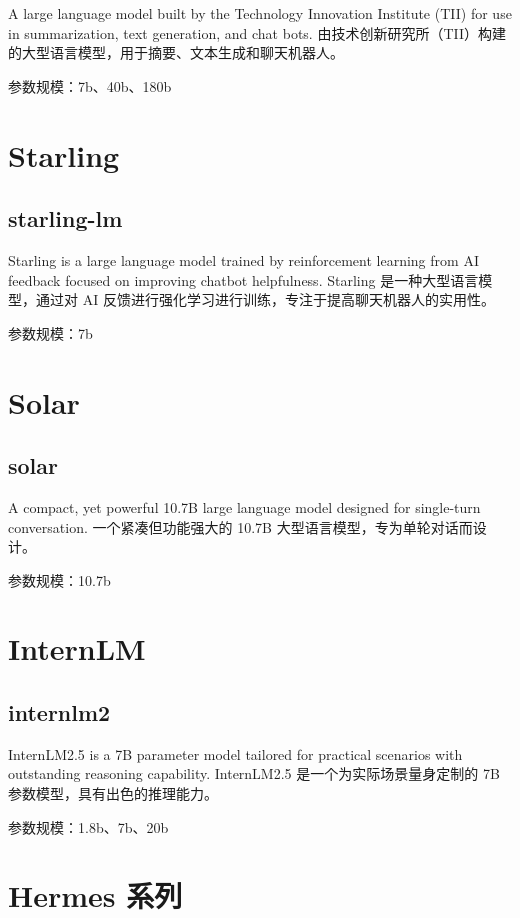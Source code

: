 \documentclass[12pt,UTF8]{ctexbook}
\begin{document}
A large language model built by the Technology Innovation Institute (TII) for use in summarization, text generation, and chat bots.
由技术创新研究所（TII）构建的大型语言模型，用于摘要、文本生成和聊天机器人。

参数规模：7b、40b、180b

\section{Starling}

\subsection{starling-lm}

Starling is a large language model trained by reinforcement learning from AI feedback focused on improving chatbot helpfulness.
Starling 是一种大型语言模型，通过对 AI 反馈进行强化学习进行训练，专注于提高聊天机器人的实用性。

参数规模：7b

\section{Solar}

\subsection{solar}

A compact, yet powerful 10.7B large language model designed for single-turn conversation.
一个紧凑但功能强大的 10.7B 大型语言模型，专为单轮对话而设计。

参数规模：10.7b

\section{InternLM}

\subsection{internlm2}

InternLM2.5 is a 7B parameter model tailored for practical scenarios with outstanding reasoning capability.
InternLM2.5 是一个为实际场景量身定制的 7B 参数模型，具有出色的推理能力。

参数规模：1.8b、7b、20b

\section{Hermes 系列}
\end{document}
